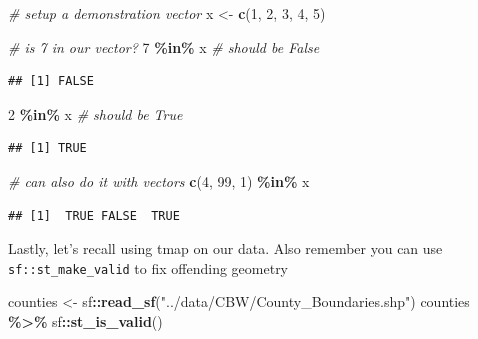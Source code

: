 \documentclass[]{article}
\newenvironment{Shaded}{\begin{snugshade}}{\end{snugshade}}
\newcommand{\CommentTok}[1]{\textcolor[rgb]{0.56,0.35,0.01}{\textit{#1}}}
\newcommand{\DecValTok}[1]{\textcolor[rgb]{0.00,0.00,0.81}{#1}}
\newcommand{\FunctionTok}[1]{\textcolor[rgb]{0.13,0.29,0.53}{\textbf{#1}}}
\newcommand{\NormalTok}[1]{#1}
\newcommand{\OtherTok}[1]{\textcolor[rgb]{0.56,0.35,0.01}{#1}}
\newcommand{\SpecialCharTok}[1]{\textcolor[rgb]{0.81,0.36,0.00}{\textbf{#1}}}
\newcommand{\StringTok}[1]{\textcolor[rgb]{0.31,0.60,0.02}{#1}}
\begin{document}
\begin{Shaded}
\begin{Highlighting}[]
\CommentTok{\# setup a demonstration vector}
\NormalTok{x }\OtherTok{\textless{}{-}} \FunctionTok{c}\NormalTok{(}\DecValTok{1}\NormalTok{, }\DecValTok{2}\NormalTok{, }\DecValTok{3}\NormalTok{, }\DecValTok{4}\NormalTok{, }\DecValTok{5}\NormalTok{)}

\CommentTok{\# is 7 in our vector?}
\DecValTok{7} \SpecialCharTok{\%in\%}\NormalTok{ x }\CommentTok{\# should be False}
\end{Highlighting}
\end{Shaded}

\begin{verbatim}
## [1] FALSE
\end{verbatim}

\begin{Shaded}
\begin{Highlighting}[]
\DecValTok{2} \SpecialCharTok{\%in\%}\NormalTok{ x }\CommentTok{\# should be True}
\end{Highlighting}
\end{Shaded}

\begin{verbatim}
## [1] TRUE
\end{verbatim}

\begin{Shaded}
\begin{Highlighting}[]
\CommentTok{\# can also do it with vectors}
\FunctionTok{c}\NormalTok{(}\DecValTok{4}\NormalTok{, }\DecValTok{99}\NormalTok{, }\DecValTok{1}\NormalTok{) }\SpecialCharTok{\%in\%}\NormalTok{ x}
\end{Highlighting}
\end{Shaded}

\begin{verbatim}
## [1]  TRUE FALSE  TRUE
\end{verbatim}

Lastly, let's recall using tmap on our data. Also remember you can use
\texttt{sf::st\_make\_valid} to fix offending geometry

\begin{Shaded}
\begin{Highlighting}[]
\NormalTok{counties }\OtherTok{\textless{}{-}}\NormalTok{ sf}\SpecialCharTok{::}\FunctionTok{read\_sf}\NormalTok{(}\StringTok{"../data/CBW/County\_Boundaries.shp"}\NormalTok{)}
\NormalTok{counties }\SpecialCharTok{\%\textgreater{}\%}\NormalTok{ sf}\SpecialCharTok{::}\FunctionTok{st\_is\_valid}\NormalTok{()}
\end{Highlighting}
\end{Shaded}
\end{document}
